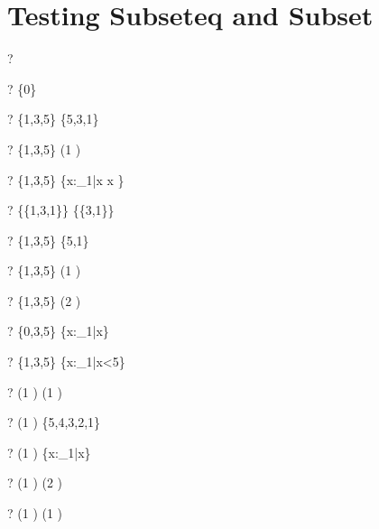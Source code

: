 \documentclass{article}
\begin{document}
\section{Testing Subseteq and Subset}

\begin{zed} \vdash?  \emptyset \subseteq \emptyset[\nat] \end{zed}
\begin{zed} \vdash?  \emptyset \subseteq \{0\} \end{zed}
\begin{zed} \vdash?  \{1,3,5\} \subseteq \{5,3,1\} \end{zed}
\begin{zed} \vdash?  \{1,3,5\} \subseteq (1 ) \end{zed}
\begin{zed} \vdash?  \{1,3,5\} \subseteq \{x:\nat_1|x \land x \} \end{zed}
\begin{zed} \vdash?  \{\{1,3,1\}\} \subseteq \{\{3,1\}\} \end{zed}
\begin{zed} \vdash?  \lnot \{1,3,5\} \subseteq \{5,1\} \end{zed}
\begin{zed} \vdash?  \lnot \{1,3,5\} \subseteq (1 ) \end{zed}
\begin{zed} \vdash?  \lnot \{1,3,5\} \subseteq (2 ) \end{zed}
\begin{zed} \vdash?  \lnot \{0,3,5\} \subseteq \{x:\nat_1|x\} \end{zed}
\begin{zed} \vdash?  \lnot \{1,3,5\} \subseteq \{x:\nat_1|x<5\} \end{zed}
\begin{zed} \vdash?  (1 ) \subseteq (1 ) \end{zed}
\begin{zed} \vdash?  (1 ) \subseteq \{5,4,3,2,1\} \end{zed}
\begin{zed} \vdash?  (1 ) \subseteq \{x:\nat_1|x\} \end{zed}
\begin{zed} \vdash?  \lnot (1 ) \subseteq (2 ) \end{zed}
\begin{zed} \vdash?  \lnot (1 ) \subseteq (1 ) \end{zed}
\end{document}
